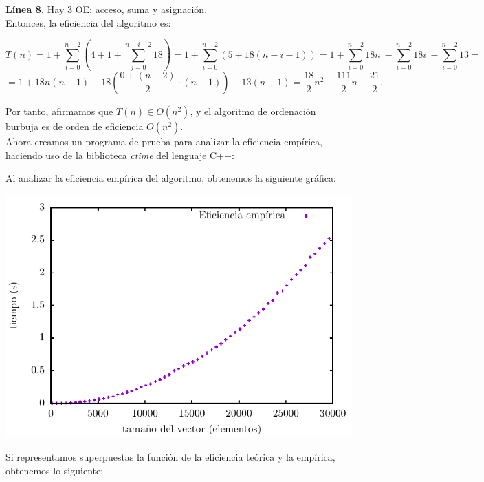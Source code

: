 \documentclass[11pt,a4paper]{article}
\begin{document}
\textbf{Línea 8.} Hay 3 OE: acceso, suma y asignación.\\

Entonces, la eficiencia del algoritmo es:

$$ T(n) = 1+ \sum_{i=0}^{n-2} \left( 4 + 1 + \sum_{j=0}^{n-i-2} 18 \right) = 1+ \sum_{i=0}^{n-2} \left( 5 + 18(n-i-1) \right) = 1 + \sum_{i=0}^{n-2} 18n\ - \sum_{i=0}^{n-2} 18i\ - \sum_{i=0}^{n-2} 13 = $$ $$ = 1 + 18n(n-1) - 18 \left( \frac{0 + (n-2)}{2} \cdot (n-1) \right) - 13(n-1) = \frac{18}{2}n^2 - \frac{111}{2} n - \frac{21}{2}.$$

Por tanto, afirmamos que $T(n) \in O(n^2)$, y el algoritmo de ordenación burbuja es de orden de eficiencia $O(n^2)$.\\

Ahora creamos un programa de prueba para analizar la eficiencia empírica, haciendo uso de la biblioteca \emph{ctime} del lenguaje C++:



Al analizar la eficiencia empírica del algoritmo, obtenemos la siguiente gráfica:\\

\begin{center}
	\includegraphics{img/tiempos_burbuja.pdf}
\end{center}

Si representamos superpuestas la función de la eficiencia teórica y la empírica, obtenemos lo siguiente:\\
\end{document}
